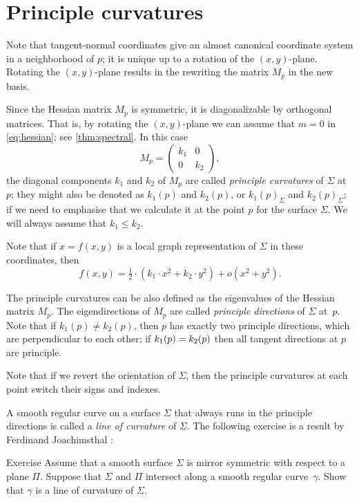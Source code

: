 \section{Principle curvatures}

Note that tangent-normal coordinates give an almost canonical coordinate system in a neighborhood of $p$;
it is unique up to a rotation of  the $(x,y)$-plane.
Rotating the $(x,y)$-plane results in the rewriting   
the matrix $M_p$ in the new basis.

Since the Hessian matrix $M_p$ is symmetric, it is diagonalizable by orthogonal matrices.
That is, by rotating the $(x,y)$-plane we can assume that $m=0$ in \ref{eq:hessian}; see \ref{thm:spectral}.
In this case
\[M_p=\begin{pmatrix}
   k_1
   &0
   \\
   0
   &k_2
  \end{pmatrix},
\]
the diagonal components $k_1$ and $k_2$ of $M_p$ are called \emph{principle curvatures} of $\Sigma$ at $p$;
they might also be denoted as $k_1(p)$ and $k_2(p)$, or $k_1(p)_\Sigma$ and $k_2(p)_\Sigma$;
if we need to emphasise that we calculate it at the point $p$ for the surface $\Sigma$.
We will always assume that $k_1\le k_2$.


Note that if $x=f(x,y)$ is a local graph representation of $\Sigma$ in these coordinates, then 
\[f(x,y)=\tfrac12\cdot(k_1\cdot x^2+k_2\cdot y^2)+o(x^2+y^2).\]

The principle curvatures can be also defined as the eigenvalues of the Hessian matrix $M_p$.
The eigendirections of $M_p$  are called \emph{principle directions} of $\Sigma$ at~$p$.
Note that if $k_1(p)\ne k_2(p)$, then $p$ has exactly two principle directions, which are perpendicular to each other; if $k_1(p)\z= k_2(p)$ then all tangent directions at $p$ are principle.

Note that if we revert the orientation of $\Sigma$, then the principle curvatures at each point switch their signs and indexes.

A smooth regular curve on a surface $\Sigma$ that always runs in the principle directions is called a \emph{line of curvature} of $\Sigma$.  
The following exercise is a result by Ferdinand Joachimsthal \cite{joachimsthal}:

\begin{thm}{Exercise}\label{ex:line-of-curvature}
Assume that a smooth surface $\Sigma$ is mirror symmetric with respect to  a plane $\Pi$.
Suppose that $\Sigma$ and $\Pi$ intersect along a smooth regular curve~$\gamma$.
Show that $\gamma$ is a line of curvature of $\Sigma$.
\end{thm}

